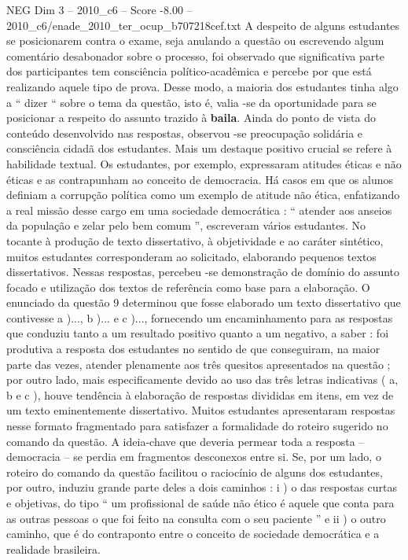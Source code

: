\begin{textsample}{NEG Dim 3 – 2010\_c6 – Score -8.00 – 2010\_c6/enade\_2010\_ter\_ocup\_b707218cef.txt}
A despeito de alguns estudantes se posicionarem contra o exame, seja anulando a questão ou escrevendo algum comentário desabonador sobre o processo, foi observado que significativa parte dos participantes tem consciência político-acadêmica e percebe por que está realizando aquele tipo de prova.
Desse modo, a maioria dos estudantes tinha algo a “ dizer “ sobre o tema da questão, isto é, valia -se da oportunidade para se posicionar a respeito do assunto trazido à \textbf{baila}.
Ainda do ponto de vista do conteúdo desenvolvido nas respostas, observou -se preocupação solidária e consciência cidadã dos estudantes.
Mais um destaque positivo crucial se refere à habilidade textual.
Os estudantes, por exemplo, expressaram atitudes éticas e não éticas e as contrapunham ao conceito de democracia.
Há casos em que os alunos definiam a corrupção política como um exemplo de atitude não ética, enfatizando a real missão desse cargo em uma sociedade democrática : “ atender aos anseios da população e zelar pelo bem comum ”, escreveram vários estudantes.
No tocante à produção de texto dissertativo, à objetividade e ao caráter sintético, muitos estudantes corresponderam ao solicitado, elaborando pequenos textos dissertativos.
Nessas respostas, percebeu -se demonstração de domínio do assunto focado e utilização dos textos de referência como base para a elaboração.
O enunciado da questão 9 determinou que fosse elaborado um texto dissertativo que contivesse a )..., b )... e c )..., fornecendo um encaminhamento para as respostas que conduziu tanto a um resultado positivo quanto a um negativo, a saber : foi produtiva a resposta dos estudantes no sentido de que conseguiram, na maior parte das vezes, atender plenamente aos três quesitos apresentados na questão ; por outro lado, mais especificamente devido ao uso das três letras indicativas ( a, b e c ), houve tendência à elaboração de respostas divididas em itens, em vez de um texto eminentemente dissertativo.
Muitos estudantes apresentaram respostas nesse formato fragmentado para satisfazer a formalidade do roteiro sugerido no comando da questão.
A ideia-chave que deveria permear toda a resposta – democracia – se perdia em fragmentos desconexos entre si.
Se, por um lado, o roteiro do comando da questão facilitou o raciocínio de alguns dos estudantes, por outro, induziu grande parte deles a dois caminhos : i ) o das respostas curtas e objetivas, do tipo “ um profissional de saúde não ético é aquele que conta para as outras pessoas o que foi feito na consulta com o seu paciente ” e ii ) o outro caminho, que é do contraponto entre o conceito de sociedade democrática e a realidade brasileira.

\end{textsample}
